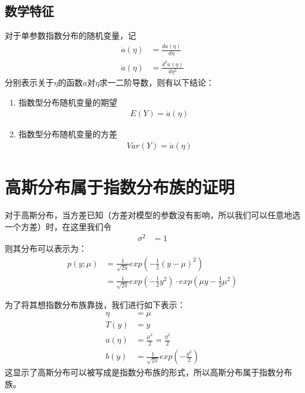 \documentclass[lang=cn,11pt,a4paper,cite=numbers]{elegantpaper}
\begin{document}
\subsection{数学特征}
  对于单参数指数分布的随机变量，记
\begin{equation}
  \begin{aligned}
    \dot{a}({\eta})&=\frac{da({\eta})}{d{\eta}}\\
    \ddot{a}({\eta})&=\frac{d^{2}a({\eta})}{d{\eta}^{2}}
  \end{aligned}
\end{equation}
分别表示关于$\eta$的函数$a$对$\eta$求一二阶导数，则有以下结论：
\begin{enumerate}
  \item 指数型分布随机变量的期望
    \begin{equation}
      \begin{aligned}
        E(Y)=\dot{a}({\eta})
      \end{aligned}
    \end{equation}
  \item 指数型分布随机变量的方差
    \begin{equation}
      \begin{aligned}
        Var(Y)=\ddot{a}({\eta})
      \end{aligned}
    \end{equation}
\end{enumerate}

\section{高斯分布属于指数分布族的证明}
  对于高斯分布，当方差已知（方差对模型的参数没有影响，所以我们可以任意地选一个方差）时，在这里我们令
\begin{equation}
  \begin{aligned}
    {\sigma}^{2}&=1
  \end{aligned}
\end{equation}
则其分布可以表示为：
\begin{equation}
  \begin{aligned}
    p(y;{\mu})&=\frac{1}{\sqrt{2{\pi}}}exp\left(-\frac{1}{2}(y-{\mu})^{2}\right)\\
              &=\frac{1}{\sqrt{2{\pi}}}exp\left(-\frac{1}{2}y^{2}\right){\cdot}exp\left({\mu}y-\frac{1}{2}{\mu}^{2}\right)
  \end{aligned}
\end{equation}

  为了将其想指数分布族靠拢，我们进行如下表示：
\begin{equation}
  \begin{aligned}
    {\eta}&={\mu}\\
    T(y)&=y\\
    a({\eta})&=\frac{{\mu}^{2}}{2}=\frac{{\eta}^{2}}{2}\\
    b(y)&=\frac{1}{\sqrt{2{\pi}}}exp(-\frac{y^{2}}{2})
  \end{aligned}
\end{equation}
这显示了高斯分布可以被写成是指数分布族的形式，所以高斯分布属于指数分布族。
\end{document}
